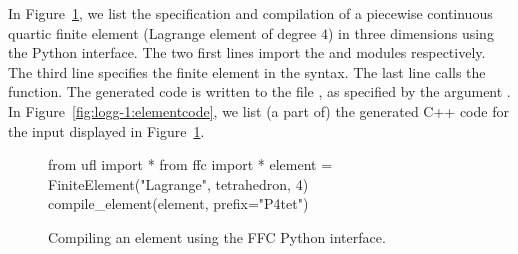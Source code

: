 In Figure~\ref{fig:logg-1:python:element}, we list the specification and
compilation of a piecewise continuous quartic finite element (Lagrange
element of degree $4$) in three dimensions using the
\ffc{} Python interface. The two first lines import the \ufl{}
and \ffc{} modules respectively. The third line specifies the finite
element in the \ufl{} syntax. The last line calls the \ffc{}
 function. The generated code is written to
the file , as specified by the argument . In
Figure~\ref{fig:logg-1:elementcode}, we list (a part of) the generated
C++ code for the input displayed in Figure~\ref{fig:logg-1:python:element}.

\begin{figure}
  \begin{python}
from ufl import *
from ffc import *
element = FiniteElement("Lagrange", tetrahedron, 4)
compile_element(element, prefix="P4tet")
  \end{python}
  \caption{Compiling an element using the FFC Python interface.}
  \label{fig:logg-1:python:element}
\end{figure}

